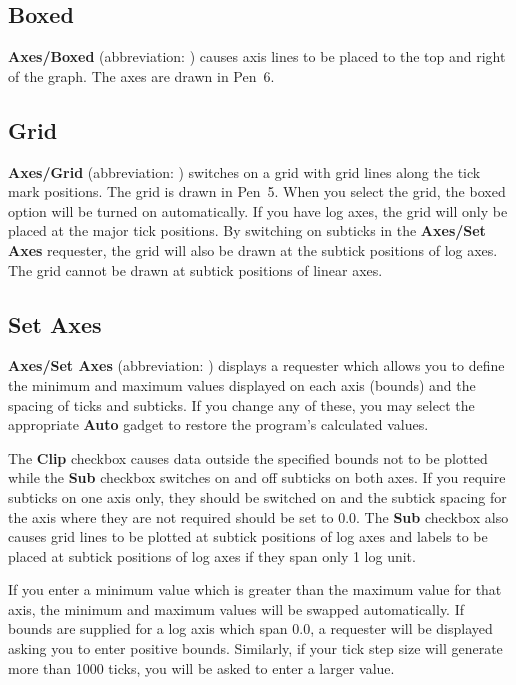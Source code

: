 \subsection{Boxed}
{\bf Axes/Boxed} (abbreviation: ) causes axis  
lines to be placed to the top and right of the graph. The axes are drawn in Pen~6.


\subsection{Grid}
{\bf Axes/Grid} (abbreviation: )  switches on a grid with 
grid lines along the tick mark positions. The grid is drawn in Pen~5.
When you select the grid, the boxed option will be turned on automatically.
If you have log axes, the grid will only be placed at the major tick positions. By 
switching on subticks in the {\bf Axes/Set Axes} requester, the grid will also be 
drawn at the subtick positions of log axes. The grid cannot be drawn at subtick 
positions of linear axes.

\subsection{Set Axes}
\label{ss:bounds}
{\bf Axes/Set Axes} (abbreviation: ) displays a requester which allows you to 
define the minimum and maximum 
values displayed on each axis (bounds) and the spacing of ticks 
 and subticks. 
If you change any of these, you may select the appropriate {\bf Auto} gadget to 
restore the program's calculated values.

The {\bf Clip} checkbox causes data outside the specified 
bounds not to be plotted 
while the {\bf Sub} checkbox switches on and off subticks on both axes. If you 
require subticks on one axis only, they should be switched on and the 
subtick spacing for the axis where they are not required should be set to 
0.0.
The {\bf Sub} checkbox also causes grid lines to be plotted at subtick positions of 
log axes and labels to be placed at subtick positions of log axes if they span only 
1 log unit.

If you enter a minimum value which is greater than the maximum value for that axis, 
the minimum and maximum values will be swapped automatically. If bounds are 
supplied for a log axis which span 0.0, a requester will be displayed asking you to 
enter positive bounds. Similarly, if your tick step size will generate more than 
1000 ticks, you will be asked to enter a larger value.

